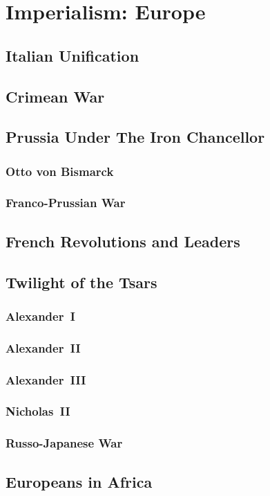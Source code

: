 \chapter{Imperialism: Europe}

\section{Italian Unification}

\section{Crimean War}

\section{Prussia Under The Iron Chancellor}

\subsection*{Otto von Bismarck}

\subsection*{Franco-Prussian War}

\section{French Revolutions and Leaders}

\section{Twilight of the Tsars}

\subsection*{Alexander~I}

\subsection*{Alexander~II}

\subsection*{Alexander~III}

\subsection*{Nicholas~II}

\subsection*{Russo-Japanese War}

\section{Europeans in Africa}
